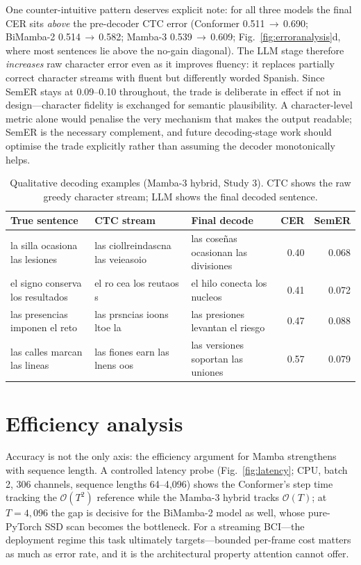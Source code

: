 \documentclass[11pt,a4paper]{report}
\begin{document}
One counter-intuitive pattern deserves explicit note: for all three models
the final CER sits \emph{above} the pre-decoder CTC error (Conformer
0.511\,$\to$\,0.690; BiMamba-2 0.514\,$\to$\,0.582; Mamba-3
0.539\,$\to$\,0.609; Fig.~\ref{fig:erroranalysis}d, where most sentences
lie above the no-gain diagonal). The LLM stage therefore \emph{increases}
raw character error even as it improves fluency: it replaces partially
correct character streams with fluent but differently worded Spanish. Since
SemER stays at 0.09--0.10 throughout, the trade is deliberate in effect if
not in design---character fidelity is exchanged for semantic plausibility.
A character-level metric alone would penalise the very mechanism that makes
the output readable; SemER is the necessary complement, and future
decoding-stage work should optimise the trade explicitly rather than
assuming the decoder monotonically helps.

\begin{table}[htbp]
\centering
\caption{Qualitative decoding examples (Mamba-3 hybrid, Study 3). CTC shows
the raw greedy character stream; LLM shows the final decoded sentence.}
\label{tab:qualitative}
\small
\begin{tabular}{p{3.1cm}p{3.4cm}p{3.6cm}rr}
\toprule
True sentence & CTC stream & Final decode & CER & SemER \\
\midrule
la silla ocasiona las lesiones &
las ciollreindascna las veieasoio &
las coseñas ocasionan las divisiones & 0.40 & 0.068 \\
el signo conserva los resultados &
el ro cea los reutaos s &
el hilo conecta los nucleos & 0.41 & 0.072 \\
las presencias imponen el reto &
las prsncias ioons ltoe la &
las presiones levantan el riesgo & 0.47 & 0.088 \\
las calles marcan las lineas &
las fiones earn las lnens oos &
las versiones soportan las uniones & 0.57 & 0.079 \\
\bottomrule
\end{tabular}
\end{table}

\section{Efficiency analysis}
\label{sec:efficiency}
Accuracy is not the only axis: the efficiency argument for Mamba
strengthens with sequence length. A controlled latency probe
(Fig.~\ref{fig:latency}; CPU, batch 2, 306 channels, sequence lengths
64--4{,}096) shows the Conformer's step time tracking the $\mathcal{O}(T^2)$
reference while the Mamba-3 hybrid tracks $\mathcal{O}(T)$; at $T=4{,}096$
the gap is decisive for the BiMamba-2 model as well, whose pure-PyTorch SSD
scan becomes the bottleneck. For a streaming BCI---the deployment regime
this task ultimately targets---bounded per-frame cost matters as much as
error rate, and it is the architectural property attention cannot offer.
\end{document}
